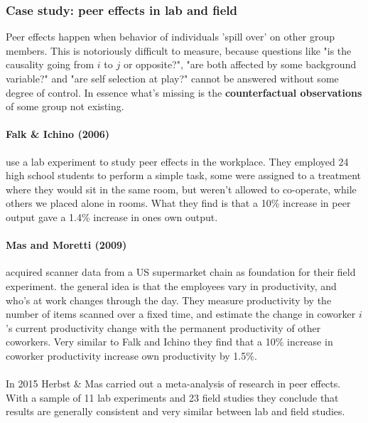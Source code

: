 \documentclass[12pt, a4paper]{article}
\begin{document}
\begin{multicols}{2}
\subsubsection{Case study: peer effects in lab and field}
Peer effects happen when behavior of individuals 'spill over' on other group members. This is notoriously difficult to measure, because questions like "is the causality going from $i$ to $j$ or opposite?", "are both affected by some background variable?" and "are self selection at play?" cannot be answered without some degree of control. In essence what's missing is the \textbf{counterfactual observations} of some group not existing. 

\paragraph{Falk \& Ichino (2006)} use a lab experiment to study peer effects in the workplace. They employed 24 high school students to perform a simple task, some were assigned to a treatment where they would sit in the same room, but weren't allowed to co-operate, while others we placed alone in rooms. What they find is that a 10\% increase in peer output gave a 1.4\% increase in ones own output.

\paragraph{Mas and Moretti (2009)} acquired scanner data from a US supermarket chain as foundation for their field experiment. the general idea is that the employees vary in productivity, and who's at work changes through the day. They measure productivity by the number of items scanned over a fixed time, and estimate the change in coworker $i$'s current productivity change with the permanent productivity of other coworkers. Very similar to Falk and Ichino they find that a 10\% increase in coworker productivity increase own productivity by 1.5\%.
\\ \\
In 2015 Herbst \& Mas carried out a meta-analysis of research in peer effects. With a sample of 11 lab experiments and 23 field studies they conclude that results are generally consistent and very similar between lab and field studies. 


\end{multicols}
\end{document}
